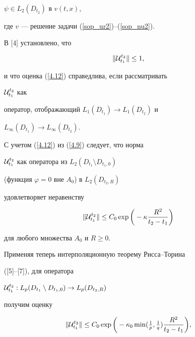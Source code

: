 $\psi \in L_2(D_{t_2})$ в $v(t,x)$,


где $v$ --- решение задачи (\ref{sop_ur2})--(\ref{sop_nu2}).





В [4] установлено, что 


\begin{equation} 


\| {\cal U}_{t_1}^{t_2} \| \leq 1, \label{4.12}


\end{equation}


и что оценка (\ref{4.12}) справедлива, если рассматривать 


${\cal U}_{t_1}^{t_2}$ как


оператор, отображающий $L_1(D_{t_1})\to L_1(D_{t_2})$ и


$L_\infty (D_{t_1})\to L_\infty (D_{t_2})$.


 


С учетом (\ref{4.12}) из (\ref{4.9}) следует, что норма


${\cal U}_{t_1}^{t_2}$ как оператора из $L_2(D_{t_1}\setminus D_{t_1,0})$ 


(функция $\varphi =0$ вне $A_0$) в $L_2(D_{t_2,R})$


удовлетворяет неравенству


$$


\| {\cal U}_{t_1}^{t_2} \| \leq C_0 \exp


\bigg(-\kappa \frac{R^2}{t_2 -t_1}\bigg)


$$


для любого множества $A_0$ и $R\geq 0$.





Применяя теперь интерполяционную теорему Рисса--Торина


([5]--[7]), для оператора


${\cal U}_{t_1}^{t_2}: L_p(D_{t_1}\setminus D_{t_1,0})\to L_p(D_{t_2,R})$


получим оценку


\begin{equation}


\| {\cal U}_{t_1}^{t_2}\| \leq C_0 \exp


\bigg(-\kappa_0 \min(\tfrac{1}{p},\tfrac{1}{q})


\frac{R^2}{t_2-t_1}\bigg), \label{4.13}


\end{equation}


